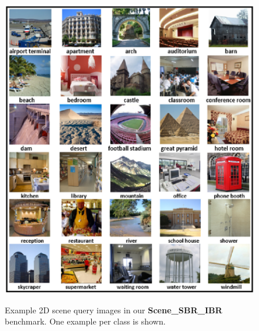 \documentclass[times, 10pt,twocolumn]{article}
\begin{document}
\begin{figure}[htb]
\centering
{
\includegraphics[width=1.0\linewidth]{SampleImages}
}
\caption{Example 2D scene query images in our \textbf{Scene\_SBR\_IBR} benchmark. One example per class is shown.}
\label{BenchmarkImageExamples}
\end{figure}
\end{document}
